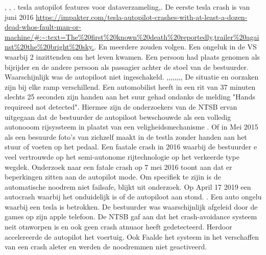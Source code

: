 \cite{bozdagTherac25},	\cite{levesonTurnerTheracAbstract}, 	\cite{stackexchange2021therac25code}.
\newline \indent
tesla autopilot features voor dataverzameling\cite{denneyjdsupraFeds},\cite{gritti24062020tesladataengine}.
 De eerste tesla crash is van juni 2016 \url{https://impakter.com/tesla-autopilot-crashes-with-at-least-a-dozen-dead-whos-fault-man-or-machine/#:~:text=The%20first%20known%20death%20reportedly,trailer%20against%20the%20bright%20sky.}. En meerdere zouden volgen.
Een ongeluk in  de VS waarbij 2 inzittenden om het leven kwamen. Een persoon had plaats genomen als bijrijder en de andere persoon als passagier achter de stoel van de bestuurder. Waarschijnlijk was de autopiloot niet ingeschakeld.
\cite{anderson30042021secondteslacrash},\cite{raynal20042021probeTeslaCrash},\cite{firstpress11052021fatalnonautopilot},\cite{cochran18042021nodriverTeslaCrash},\cite{gitlin11052021autopilot},\cite{sommerfield12072021NHTSAmandateresult},\cite{hawkins30062021nhtsarequiresreporting},\cite{wilson19042021teslacrashregulators},\cite{mcfarland22042021selfdrivingrisks}
De situatie en oorzaken zijn bij elke ramp verschillend. 
Een automobilist heeft in een rit van 37 minuten slechts 25 seconden zijn handen aan het suur gehad ondanks de melding "Hands requireed not detected". Hiermee zijn de onderzoekers van de NTSB ervan uitgegaan dat de bestuurder de autopiloot bewschouwde als een volledig autonooom rijsyssteem in plaatst van een veligheidsmechanisme
\cite{oremus21062017fatalTeslaCrash}. Of in 
Mei 2015 als een besuurde foto's van zichzelf maakt in de testla zonder handen aan het stuur of voeten op het pedaal.
\cite{guardian15052021teslacrashHandsOnWheel}
Een faatale crash in 2016 waarbij de bestuurder  e veel vertrouwde op het semi-autonome rijtechnologie op het verkeerde type wegdek.
\cite{Puzzanghera13092017TeslaSharesBlame}
Onderzoek naar een fatale crash op 7 mei 2016 toont aan dat er beperkingen zitten aan de autopilot mode. Om specifiek te zijin is de automatische noodrem niet failsafe, blijkt uit onderzoek.
\cite{jaillet02022017teslaAutopilotLimitations}
\cite{reuters03102019teslaAutoParkingFail}
\cite{dowling23042021}
Op  April 17 2019 een autocrash waarbij het onduidelijk is of de autopiloot aan stond.
\cite{young05112021fatalTeslaReport}. Een auto ongelu waarbij een tesla is betrokken. De bestuurder was waarschijnlijk afgeleid door de games op zijn apple telefoon. De NTSB gaf aan dat het crash-avoidance systeem neit otnworpen is en ook geen crash atnuaor heeft gedetecteerd. Herdoor accelereerde de autopilot  het voertuig. Ook Faalde het systeem in het verschaffen van een crash aleter en werden de noodremmen niet geactiveerd.
